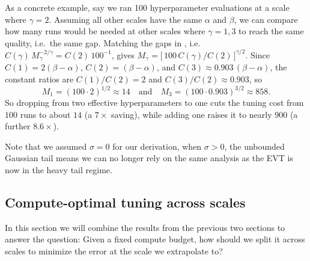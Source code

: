 As a concrete example, say we ran 100 hyperparameter evaluations at a scale where $\gamma = 2$. Assuming all other scales have the same $\alpha$ and $\beta$, we can compare how many runs would be needed at other scales where $\gamma = 1, 3$ to reach the same quality, i.e.\ the same gap.
Matching the gaps in , i.e.\ $C(\gamma)\, M_\gamma^{-2/\gamma} = C(2)\, 100^{-1}$, gives $M_\gamma = \bigl[\,100\, C(\gamma)/C(2)\,\bigr]^{\gamma/2}$. Since $C(1) = 2(\beta - \alpha)$, $C(2) = (\beta - \alpha)$, and $C(3) \approx 0.903\,(\beta - \alpha)$, the constant ratios are $C(1)/C(2) = 2$ and $C(3)/C(2) \approx 0.903$, so
%
\begin{equation*}
    M_1 = (100 \cdot 2)^{1/2}  \approx 14
    \quad\text{and}\quad
    M_3 = (100 \cdot 0.903)^{3/2}  \approx 858.
\end{equation*}
%
So dropping from two effective hyperparameters to one cuts the tuning cost from $100$ runs to about $14$ (a $7\times$ saving), while adding one raises it to nearly $900$ (a further $8.6\times$).

Note that we assumed $\sigma = 0$ for our derivation, when $\sigma > 0$, the unbounded Gaussian tail means we can no longer rely on the same analysis as the EVT is now in the heavy tail regime.




\subsection{Compute-optimal tuning across scales}
\label{sec:compute-optimal-tuning}

In this section we will combine the results from the previous two sections to answer the question: Given a fixed compute budget, how should we split it across scales to minimize the error at the scale we extrapolate to?

